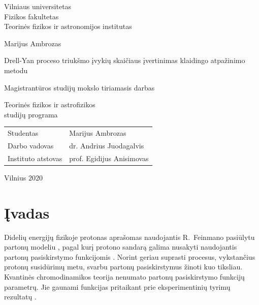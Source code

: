 \documentclass[a4paper, 12pt, oneside]{article}
\begin{document}

\begin{titlepage}
\centering
{\large Vilniaus universitetas \\ Fizikos fakultetas \\ Teorinės fizikos ir astronomijos institutas \par}
\vspace{3.5cm}
{\Large Marijus Ambrozas \par}
\vspace{0.3cm}
{\Large Drell-Yan proceso triukšmo įvykių skaičiaus įvertinimas klaidingo atpažinimo metodu\par}
\vspace{0.8cm}
{\large Magistrantūros studijų mokslo tiriamasis darbas \par}
\vspace{0.8cm}
{\large Teorinės fizikos ir astrofizikos \\ studijų programa \par}
\vspace{3.5cm}
{\large \begin{tabular*}{0.9\textwidth}{@{\extracolsep{\fill}}ll}
Studentas & Marijus Ambrozas\tabularnewline[0.5cm]
Darbo vadovas & dr. Andrius Juodagalvis\tabularnewline[0.5cm]
Instituto atstovas & prof. Egidijus Anisimovas\tabularnewline[0.5cm]
\end{tabular*} \par}
\vspace{4cm}
{\large Vilnius $2020$\par}
\end{titlepage}


\clearpage
\tableofcontents
\clearpage

\section{Įvadas}%

Didelių energijų fizikoje protonas aprašomas naudojantis R.\ Feinmano pasiūlytu partonų modeliu \cite{FeynPartons},
pagal kurį protono sandarą galima nusakyti naudojantis partonų pasiskirstymo funkcijomis \cite{BjorkPartons}.
Norint geriau suprasti procesus, vykstančius protonų susidūrimų metu, svarbu partonų pasiskirstymus žinoti kuo tiksliau.
Kvantinės chromodinamikos teorija nenumato partonų pasiskirstymo funkcijų parametrų.
Jie gaunami funkcijas pritaikant prie eksperimentinių tyrimų rezultatų \cite{NNPDF, PDF_ABMP16, CTEQ2019}.
\end{document}
